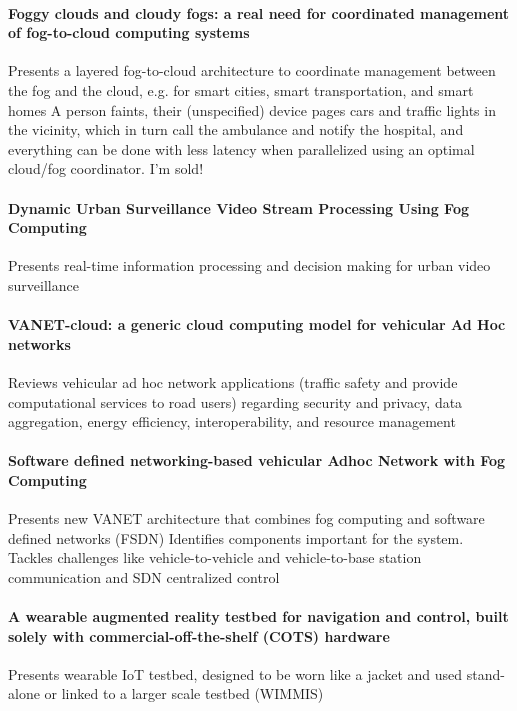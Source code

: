 \paragraph{Foggy clouds and cloudy fogs: a real need for coordinated management of fog-to-cloud computing systems}\cite{masip-bruin_foggy_2016}
Presents a layered fog-to-cloud architecture to coordinate management between the fog and the cloud, e.g. for smart cities, smart transportation, and smart homes
A person faints, their (unspecified) device pages cars and traffic lights in the vicinity,
which in turn call the ambulance and notify the hospital, and everything can be done with
less latency when parallelized using an optimal cloud/fog coordinator. I'm sold!

\paragraph{Dynamic Urban Surveillance Video Stream Processing Using Fog Computing} \cite{chen_dynamic_2016}
Presents real-time information processing and decision making for urban video surveillance

\paragraph{VANET-cloud: a generic cloud computing model for vehicular Ad Hoc networks} \cite{bitam_vanet-cloud:_2015}
Reviews vehicular ad hoc network applications (traffic safety and provide computational services to road users) regarding
security and privacy, data aggregation, energy efficiency, interoperability, and resource management

\paragraph{Software defined networking-based vehicular Adhoc Network with Fog Computing} \cite{truong_software_2015}
Presents new VANET architecture that combines fog computing and software defined networks (FSDN)
Identifies components important for the system. Tackles challenges like vehicle-to-vehicle and vehicle-to-base station communication and SDN centralized control

\paragraph{A wearable augmented reality testbed for navigation and control, built solely with commercial-off-the-shelf (COTS) hardware} \cite{behringer_wearable_2000}
Presents wearable IoT testbed, designed to be worn like a jacket and used stand-alone or linked to a larger scale testbed (WIMMIS)

